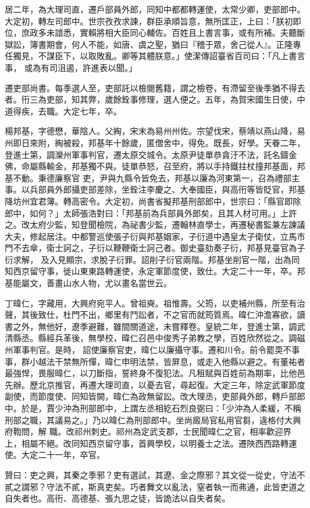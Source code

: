 \begin{pinyinscope}
 居二年，為大理司直，遷戶部員外郎，同知中都都轉運使，太常少卿，吏部郎中。大定初，轉左司郎中。世宗孜孜求諫，群臣承順旨意，無所匡正，上曰：「朕初即位，庶政多未諳悉，實賴將相大臣同心輔佐。百姓且上書言事，或有所補。夫聽斷獄訟，簿書期會，何人不能，如唐、虞之聖，猶曰『稽于眾，舍己從人』。正隆專任獨見，不謀臣下，以取敗亂。卿等其體朕意。」使潔傳詔臺省百司曰：「凡上書言事，
 或為有司沮遏，許進表以聞。」



 遷吏部尚書。每季選人至，吏部託以檢閱舊籍，謂之檢卷，有滯留至後季猶不得去者。衎三為吏部，知其弊，歲餘銓事修理，選人便之。五年，為賀宋國生日使，中道得疾，去職。大定七年，卒。



 楊邦基，字德懋，華陰人。父綯，宋末為易州州佐。宗望伐宋，蔡靖以燕山降，易州即日來附，綯被殺，邦基年十餘歲，匿僧舍中，得免。既長，好學。天眷二年，登進士第，調灤州軍事判官，遷太原交城令。太原尹徒單恭貪汙不法，託名鑄金佛，命屬縣輸金，邦基獨不與。徒單恭怒，召至府，將以手持鐵拄杖撞邦基面，邦基不動。秉德廉察官
 吏，尹與九縣令皆免去，邦基以廉為河東第一，召為禮部主事。以兵部員外郎攝吏部差除，坐銓注李慶之、大奉國臣，與高衎等皆貶官，邦基降坊州宜君簿。轉高密令。大定初，尚書省擬邦基刑部郎中，世宗曰：「縣官即除郎中，如何？」太師張浩對曰：「邦基前為兵部員外郎矣，且其人材可用。」上許之。改太府少監，知登聞檢院，為祕書少監，遷翰林直學士，再遷秘書監兼左諫議大夫，修起居注。中都警巡使張子衍與邦基姻家，子衍道中遇皇太子衛仗，立馬市門不去傘，衛士訶之，子衍以鞭鞭衛士訶己者。御史臺劾奏子衍，邦基見臺官為子衍求解，
 及入見顯宗，求脫子衍罪。詔削子衍官兩階。邦基坐削官一階，出為同知西京留守事，徙山東東路轉運使，永定軍節度使，致仕。大定二十一年，卒。邦基能屬文，善畫山水人物，尤以畫名當世云。



 丁暐仁，字藏用，大興府宛平人。曾祖奭。祖惟壽。父筠，以吏補州縣，所至有治聲，其後致仕，杜門不出，鄉里有鬥訟者，不之官而就筠質焉。暐仁沖澹寡欲，讀書之外，無他好，遼季避難，雖間關道途，未嘗釋卷。皇統二年，登進士第，調武清縣丞。縣經兵革後，無學校，暐仁召邑中俊秀子弟教之學，百姓欣然從之。調磁州軍事判官。是時，
 詔使廉察官吏，暐仁以廉攝守事。遷和川令。前令罷耎不事事，群小越法干禁無所憚，暐仁申明法禁，皆屏息，或走入他縣以避之。有董祐者最強悍，畏服暐仁，以刀斷指，誓終身不復犯法。凡租賦與百姓前為期率，比他邑先辦。歷北京推官，再遷大理司直，以憂去官，尋起復。大定三年，除定武軍節度副使，而節度使、同知皆闕，暐仁為政無留訟。改大理丞，吏部員外郎，轉戶部郎中。於是，賈少沖為刑部郎中，上謂左丞相紇石烈良弼曰：「少沖為人柔緩，不稱刑部之職，其議易之。」乃以暐仁為刑部郎中。坐尚廄局官私用官芻，違格付大興府鞫問，解
 職。改祁州刺史。祁州為定武支郡，士民聞暐仁之官，相率歡迎界上，相屬不絕。改同知西京留守事，首興學校，以明養士之法。遷陜西西路轉運使。大定二十一年，卒官。



 贊曰：吏之興，其秦之季邪？吏有選試，其遼、金之際邪？其文從一從史，守法不貳之謂邪？守法不貳，斯真吏矣。巧者舞文以亂法，窒者執一而弗通，此皆吏道之自失者也。高衎、高德基、張九思之徒，皆詭法以自失者矣。



\end{pinyinscope}
